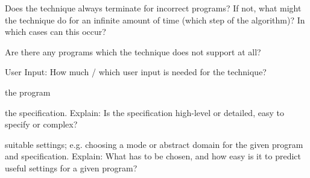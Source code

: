 \documentclass[a4paper]{article}
\begin{document}
\begin{minipage}[t]{0.16\linewidth}
\begin{betterlist}
\begin{betterlist}
\begin{betterlist}
				\item Does the technique always terminate for incorrect programs? If not, what might the technique do for an infinite amount of time (which step of the algorithm)? In which cases can this occur?

			\end{betterlist}
			\item Are there any programs which the technique does not support at all?

		\end{betterlist}
		\item \alert{User Input:} How much / which user input is needed for the technique?
		\begin{betterlist}
			\item \checkboxChecked the program
			\item \checkboxChecked the specification. Explain: Is the specification high-level or detailed, easy to specify or complex?

			\item \checkboxUnchecked suitable settings; e.g. choosing a mode or abstract domain for the given program and specification. Explain: What has to be chosen, and how easy is it to predict useful settings for a given program?


\end{betterlist}
\end{betterlist}
\end{minipage}
\end{document}
